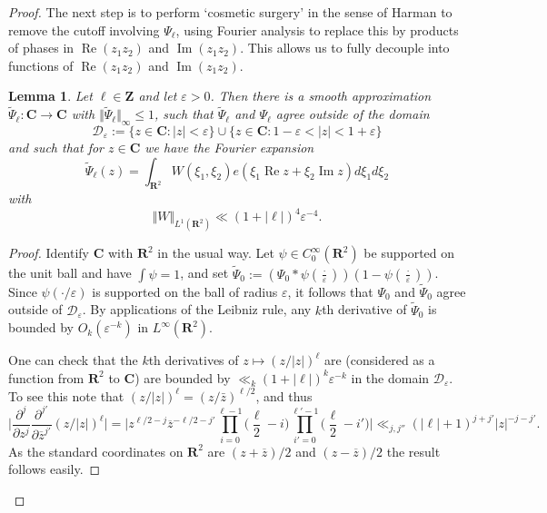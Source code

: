 \documentclass[11pt,reqno]{amsart}
\numberwithin{equation}{section}
\newtheorem{lemma}[theorem]{Lemma}
\theoremstyle{definition}
\theoremstyle{remark}
\newcommand{\mc}{\mathcal}
\newcommand{\ol}{\overline}
\newcommand{\on}{\operatorname}
\newcommand{\eps}{\varepsilon}
\renewcommand{\le}{\leqslant}
\renewcommand{\Re}{\on{Re}}
\renewcommand{\Im}{\on{Im}}
\newcommand\Z{\mathbf{Z}}
\newcommand\C{\mathbf{C}}
\newcommand\R{\mathbf{R}}
\begin{document}
\begin{proof}
The next step is to perform `cosmetic surgery' in the sense of Harman \cite{harman} to remove the cutoff involving $\Psi_{\ell}$, using Fourier analysis to replace this by products of phases in $\Re(z_1z_2)$ and $\Im(z_1 z_2)$. This allows us to fully decouple into functions of $\Re(z_1z_2)$ and $\Im(z_1z_2)$. 
\begin{lemma}\label{annulus-smooth} Let $\ell \in \Z$ and let $\eps > 0$. Then there is a smooth approximation $\tilde \Psi_{\ell} : \C \rightarrow \C$ with $\Vert \tilde \Psi_{\ell} \Vert_{\infty} \le 1$, such that $\tilde \Psi_{\ell}$ and $\Psi_{\ell}$ agree outside of the domain
\begin{equation}\label{d-eps-domain} \mc{D}_{\eps} := \{ z \in \C : |z| < \eps\} \cup \{ z \in \C : 1 - \eps < |z| < 1 + \eps\}\end{equation}
and such that for $z \in \C$ we have the Fourier expansion 
\begin{equation} \label{tilde1r-fourier}\tilde \Psi_{\ell}(z) = \int_{\R^2} W(\xi_1, \xi_2) e( \xi_1 \Re z +  \xi_2 \Im z) d \xi_1 d\xi_2\end{equation}
with 
\begin{equation}\label{ell-1-fourier-B} \Vert W \Vert_{L^1(\R^2)} \ll (1 + |\ell|)^4 \eps^{-4}.\end{equation}
\end{lemma}
\begin{proof}
Identify $\C$ with $\R^2$ in the usual way. Let $\psi \in C_0^{\infty}(\R^2)$ be supported on the unit ball and have $\int \psi = 1$, and set $\tilde\Psi_0 := (\Psi_0 \ast \psi(\frac{\cdot}{\eps})) (1 - \psi(\frac{\cdot}{\eps}))$. Since $\psi(\cdot / \eps)$ is supported on the ball of radius $\eps$, it follows that $\Psi_0$ and $\tilde \Psi_0$ agree outside of $\mc{D}_{\eps}$. By applications of the Leibniz rule, any $k$th derivative of $\tilde\Psi_0$ is bounded by $O_k(\eps^{-k})$ in $L^{\infty}(\R^2)$.

One can check that the $k$th derivatives of $z \mapsto (z/|z|)^{\ell}$ are (considered as a function from $\R^2$ to $\C$) are bounded by $\ll_k (1 + |\ell|)^k \eps^{-k}$ in the domain $\mc{D}_{\eps}$. To see this note that $(z/|z|)^{\ell} = (z/\bar{z})^{\ell/2}$, and thus 
\[\Big|\frac{\partial^j}{\partial z^{j}}\frac{\partial^{j'}}{\partial \overline{z}^{j'}}(z/|z|)^{\ell}\Big| = \Big|z^{\ell/2-j}\ol{z}^{-\ell/2-j'}\prod_{i=0}^{\ell-1}\Big(\frac{\ell}{2} - i\Big)\prod_{i'=0}^{\ell'-1}\Big(\frac{\ell}{2} - i'\Big)\Big|\ll_{j,j''}(|\ell| + 1)^{j + j'}|z|^{-j - j'}.\]
As the standard coordinates on $\R^2$ are $(z+\ol{z})/2$ and $(z-\ol{z})/2$ the result follows easily. 


\end{proof}
\end{proof}
\end{document}
